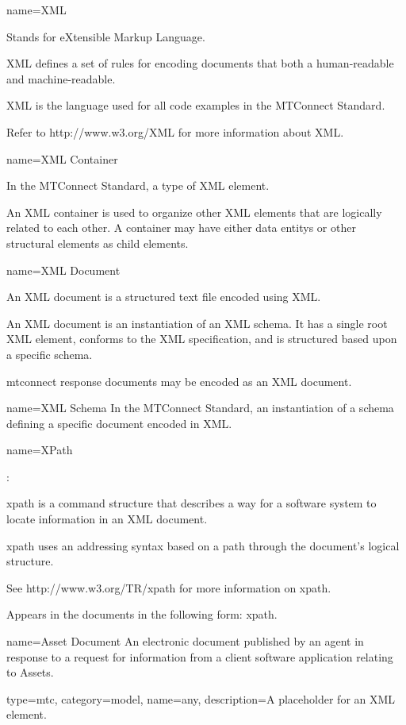{
  name={\normalfont XML}
}
{
	Stands for eXtensible Markup Language. 

	XML defines a set of rules for encoding documents that both a human-readable and machine-readable.

	XML is the language used for all code examples in the MTConnect Standard.

	Refer to http://www.w3.org/XML for more information about XML.
}


{
  name={XML Container}
}
{
	In the MTConnect Standard, a type of XML element.

	An XML container is used to organize other XML elements that are logically related to each other.   A container may have either \glspl{data entity} or other \glspl{structural element} as \glspl{child element}.
}


{
  name={XML Document}
}
{
	An XML document is a structured text file encoded using XML.

	An XML document is an instantiation of an XML schema.  It has a single root XML element, conforms to the XML specification, and is structured based upon a specific schema.

	\glspl{mtconnect response document} may be encoded as an XML document.
}


{
  name={XML Schema}
}
{
	In the MTConnect Standard, an instantiation of a schema defining a specific document encoded in XML.
}


{
  name={\normalfont XPath}
}
{
	:

	\gls{xpath} is a command structure that describes a way for a software system to locate information in an XML document.  

	\gls{xpath} uses an addressing syntax based on a path through the document's logical structure. 

	See http://www.w3.org/TR/xpath for more information on \gls{xpath}.

	Appears in the documents in the following form: \gls{xpath}.
}



{
  name={Asset Document}
}
{
	An electronic document published by an \gls{agent} in response to a \gls{request} for information from a client software application relating to Assets.
}

{
  type=mtc,
  category=model,
  name={any},
  description={A placeholder for an XML element.}
}





